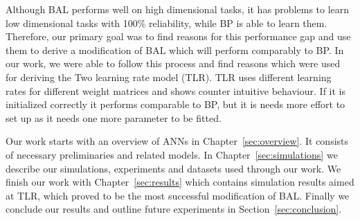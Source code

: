 


Although BAL performs well on high dimensional tasks, it has problems to learn low dimensional tasks with 100\% reliability, while BP is able to learn them. Therefore, our primary goal was to find reasons for this performance gap and use them to derive a modification of BAL which will perform comparably to BP. In our work, we were able to follow this process and find reasons which were used for deriving the Two learning rate model (TLR). TLR uses different learning rates for different weight matrices and shows counter intuitive behaviour. If it is initialized correctly it performs comparable to BP, but it is needs more effort to set up as it needs one more parameter to be fitted. 


Our work starts with an overview of ANNs in Chapter~\ref{sec:overview}. It consists of necessary preliminaries and related models. 
In Chapter~\ref{sec:simulations} we describe our simulations, experiments and datasets used through our work. 
We finish our work with Chapter~\ref{sec:results} which contains simulation results aimed at TLR, which proved to be the most successful modification of BAL. Finally we conclude our results and outline future experiments in Section~\ref{sec:conclusion}.  



